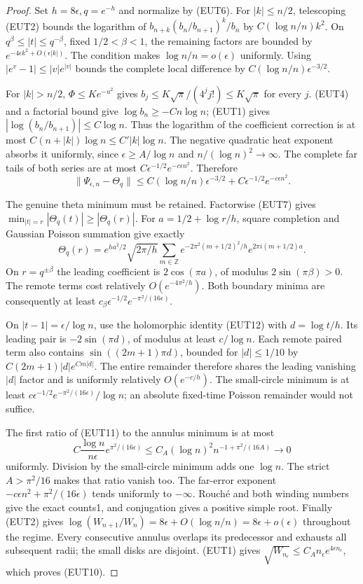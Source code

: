 \documentclass[11pt]{article}
\theoremstyle{remark}\newtheorem{remark}[theorem]{Remark}
\newcommand{\Z}{\mathbb Z}
\begin{document}
\begin{proof}
Set $h=8\epsilon,q=e^{-h}$ and normalize by (EUT6).
For $|k|\le n/2$, telescoping (EUT2) bounds the logarithm
of $b_{n+k}(b_n/b_{n+1})^k/b_n$ by $C(\log n/n)k^2$.
On $q^\beta\le|t|\le q^{-\beta}$, fixed $1/2<\beta<1$,
the remaining factors are bounded by
$e^{-4\epsilon k^2+O(\epsilon|k|)}$.
The condition makes $\log n/n=o(\epsilon)$ uniformly.
Using $|e^v-1|\le|v|e^{|v|}$ bounds the complete local
difference by $C(\log n/n)\epsilon^{-3/2}$.

For $|k|>n/2$, $\Phi\le Ke^{-u^2}$ gives
$b_j\le K\sqrt\pi/(4^jj!)\le K\sqrt\pi$ for every $j$.
(EUT4) and a factorial bound give $\log b_n\ge-Cn\log n$;
(EUT1) gives $|\log(b_n/b_{n+1})|\le C\log n$.
Thus the logarithm of the coefficient correction is at most
$C(n+|k|)\log n\le C'|k|\log n$.
The negative quadratic heat exponent absorbs it uniformly,
since $\epsilon\ge A/\log n$ and $n/(\log n)^2\to\infty$.
The complete far tails of both series are at most
$C\epsilon^{-1/2}e^{-c\epsilon n^2}$. Therefore
\[
 \|\Psi_{\epsilon,n}-\Theta_q\|
 \le C(\log n/n)\epsilon^{-3/2}
                  +C\epsilon^{-1/2}e^{-c\epsilon n^2}. \tag{EUT11}
\]

The genuine theta minimum must be retained.
Factorwise (EUT7) gives
$\min_{|t|=r}|\Theta_q(t)|\ge|\Theta_q(r)|$.
For $a=1/2+\log r/h$, square completion and
Gaussian Poisson summation give exactly
\[
 \Theta_q(r)=e^{ha^2/2}\sqrt{2\pi/h}
 \sum_{m\in\Z}e^{-2\pi^2(m+1/2)^2/h}
                         e^{2\pi i(m+1/2)a}.            \tag{EUT12}
\]
On $r=q^{\pm\beta}$ the leading coefficient is $2\cos(\pi a)$,
of modulus $2\sin(\pi\beta)>0$.
The remote terms cost relatively $O(e^{-4\pi^2/h})$.
Both boundary minima are consequently at least
$c_\beta\epsilon^{-1/2}e^{-\pi^2/(16\epsilon)}$.

On $|t-1|=\epsilon/\log n$, use the holomorphic identity
(EUT12) with $d=\log t/h$.
Its leading pair is $-2\sin(\pi d)$, of modulus at least
$c/\log n$. Each remote paired term also contains
$\sin((2m+1)\pi d)$, bounded for $|d|\le1/10$ by
$C(2m+1)|d|e^{Cm|d|}$.
The entire remainder therefore shares the leading vanishing
$|d|$ factor and is uniformly relatively $O(e^{-c/h})$.
The small-circle minimum is at least
$c\epsilon^{-1/2}e^{-\pi^2/(16\epsilon)}/\log n$;
an absolute fixed-time Poisson remainder would not suffice.

The first ratio of (EUT11) to the annulus minimum is at most
\[
 C\frac{\log n}{n\epsilon}e^{\pi^2/(16\epsilon)}
 \le C_A(\log n)^2n^{-1+\pi^2/(16A)}\longrightarrow0
\]
uniformly. Division by the small-circle minimum adds one $\log n$.
The strict $A>\pi^2/16$ makes that ratio vanish too.
The far-error exponent
$-c\epsilon n^2+\pi^2/(16\epsilon)$ tends uniformly to $-\infty$.
Rouch\'e and both winding numbers give the exact counts1,
and conjugation gives a positive simple root.
Finally (EUT2) gives
$\log(W_{n+1}/W_n)=8\epsilon+O(\log n/n)
=8\epsilon+o(\epsilon)$ throughout the regime.
Every consecutive annulus overlaps its predecessor and exhausts
all subsequent radii; the small disks are disjoint.
(EUT1) gives
$\sqrt{W_{n_\epsilon}}\le C_A n_\epsilon e^{4\epsilon n_\epsilon}$,
which proves (EUT10).
\end{proof}
\end{document}
